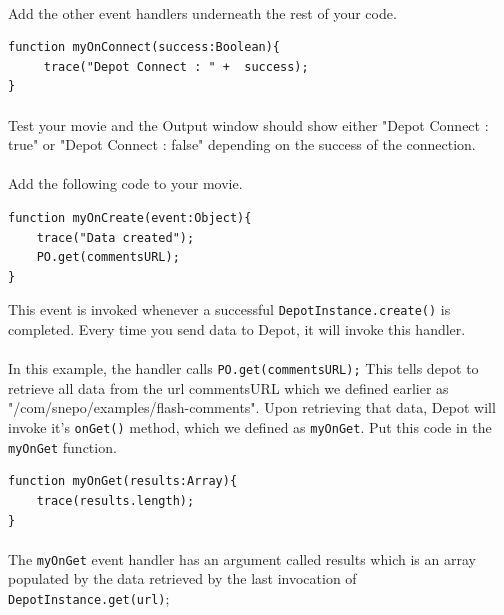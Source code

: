 \documentclass[12pt]{report}
\begin{document}
\paragraph{}
Add the other event handlers underneath the rest of your code. 

\begin{Verbatim}[frame=single]
function myOnConnect(success:Boolean){
     trace("Depot Connect : " +  success);
}
\end{Verbatim}

\paragraph{}
Test your movie and the Output window should show
either "Depot Connect : true" or "Depot Connect : false" depending on
the success of the connection.

\paragraph{}
Add the following code to your movie.

\begin{Verbatim}[frame=single]
function myOnCreate(event:Object){
	trace("Data created");
	PO.get(commentsURL);
}
\end{Verbatim}

This event is invoked whenever a successful
\texttt{DepotInstance.create()} is completed.  Every time you send
data to Depot, it will invoke this handler.

\paragraph{}
In this example, the handler calls \texttt{PO.get(commentsURL);} This
tells depot to retrieve all data from the url commentsURL which we
defined earlier as "/com/snepo/examples/flash-comments". Upon
retrieving that data, Depot will invoke it's \texttt{onGet()} method,
which we defined as \texttt{myOnGet}. Put this code in the
\texttt{myOnGet} function.

\begin{Verbatim}[frame=single]
function myOnGet(results:Array){
	trace(results.length);
}
\end{Verbatim}

\paragraph{}
The \texttt{myOnGet} event handler has an argument called results
which is an array populated by the data retrieved by the last
invocation of \texttt{DepotInstance.get(url)};
\end{document}
